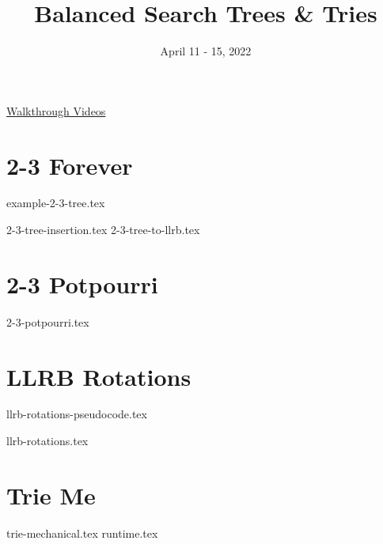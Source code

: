 \documentclass[11pt]{exam}
\title{Balanced Search Trees \& Tries}
\date{April 11 - 15, 2022}
\begin{document}
\maketitle

\href{https://youtube.com/playlist?list=PLN303KpCz_KQBcICLFly8pBMITG2cr4cc}{Walkthrough Videos}

\section{2-3 Forever}

{example-2-3-tree.tex}

\begin{questions}
{2-3-tree-insertion.tex}
{2-3-tree-to-llrb.tex}
\end{questions}
\clearpage

\section{2-3 Potpourri}

\begin{questions}
{2-3-potpourri.tex}
\end{questions}
\clearpage

\section{LLRB Rotations}

{llrb-rotations-pseudocode.tex}

\begin{questions}
{llrb-rotations.tex}
\end{questions}
\clearpage


\section{Trie Me}
\begin{questions}
{trie-mechanical.tex}
{runtime.tex}
\end{questions}
\clearpage

\end{document}

